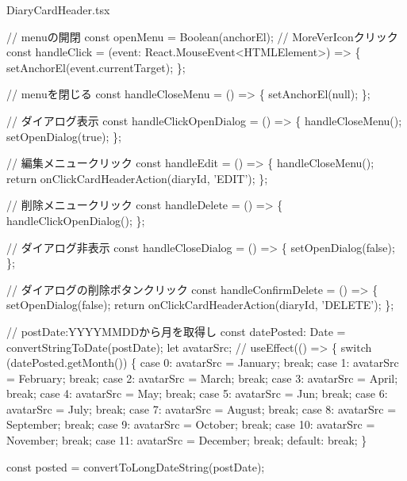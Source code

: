 \begin{starterprogram}[]{DiaryCardHeader.tsx}
{    // menuの開閉
    const openMenu = Boolean(anchorEl);
    // MoreVerIconクリック
    const handleClick = (event: React.MouseEvent\textless{}HTMLElement\textgreater{}) =\textgreater{} \{
      setAnchorEl(event.currentTarget);
    \};

    // menuを閉じる
    const handleCloseMenu = () =\textgreater{} \{
      setAnchorEl(null);
    \};

    // ダイアログ表示
    const handleClickOpenDialog = () =\textgreater{} \{
      handleCloseMenu();
      setOpenDialog(true);
    \};

    // 編集メニュークリック
    const handleEdit = () =\textgreater{} \{
      handleCloseMenu();
      return onClickCardHeaderAction(diaryId, 'EDIT');
    \};

    // 削除メニュークリック
    const handleDelete = () =\textgreater{} \{
      handleClickOpenDialog();
    \};

    // ダイアログ非表示
    const handleCloseDialog = () =\textgreater{} \{
      setOpenDialog(false);
    \};

    // ダイアログの削除ボタンクリック
    const handleConfirmDelete = () =\textgreater{} \{
      setOpenDialog(false);
      return onClickCardHeaderAction(diaryId, 'DELETE');
    \};

    // postDate:YYYYMMDDから月を取得し
    const datePosted: Date = convertStringToDate(postDate);
    let avatarSrc;
    // useEffect(() =\textgreater{} \{
    switch (datePosted.getMonth()) \{
      case 0:
        avatarSrc = January;
        break;
      case 1:
        avatarSrc = February;
        break;
      case 2:
        avatarSrc = March;
        break;
      case 3:
        avatarSrc = April;
        break;
      case 4:
        avatarSrc = May;
        break;
      case 5:
        avatarSrc = Jun;
        break;
      case 6:
        avatarSrc = July;
        break;
      case 7:
        avatarSrc = August;
        break;
      case 8:
        avatarSrc = September;
        break;
      case 9:
        avatarSrc = October;
        break;
      case 10:
        avatarSrc = November;
        break;
      case 11:
        avatarSrc = December;
        break;
      default:
        break;
    \}

    const posted = convertToLongDateString(postDate);

}
\end{starterprogram}
